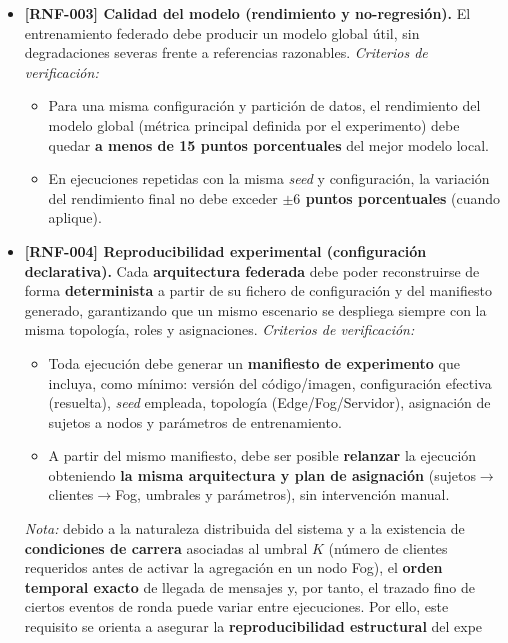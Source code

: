 \documentclass{report}
\begin{document}
\begin{itemize}
  \item \textbf{[RNF-003] Calidad del modelo (rendimiento y no-regresión).}  
  El entrenamiento federado debe producir un modelo global útil, sin degradaciones severas frente a referencias razonables.
  \textit{Criterios de verificación:}
  \begin{itemize}
    \item Para una misma configuración y partición de datos, el rendimiento del modelo global (métrica principal definida por el experimento) debe quedar \textbf{a menos de 15 puntos porcentuales} del mejor modelo local.
    \item En ejecuciones repetidas con la misma \textit{seed} y configuración, la variación del rendimiento final no debe exceder \textbf{$\pm 6$ puntos porcentuales} (cuando aplique).
  \end{itemize}

\item \textbf{[RNF-004] Reproducibilidad experimental (configuración declarativa).}  
Cada \textbf{arquitectura federada} debe poder reconstruirse de forma \textbf{determinista} a partir de su fichero de configuración y del manifiesto generado, garantizando que un mismo escenario se despliega siempre con la misma topología, roles y asignaciones.
\textit{Criterios de verificación:}
\begin{itemize}
  \item Toda ejecución debe generar un \textbf{manifiesto de experimento} que incluya, como mínimo: versión del código/imagen, configuración efectiva (resuelta), \textit{seed} empleada, topología (Edge/Fog/Servidor), asignación de sujetos a nodos y parámetros de entrenamiento.
  \item A partir del mismo manifiesto, debe ser posible \textbf{relanzar} la ejecución obteniendo \textbf{la misma arquitectura y plan de asignación} (sujetos$\rightarrow$clientes$\rightarrow$Fog, umbrales y parámetros), sin intervención manual.
\end{itemize}

\textit{Nota:} debido a la naturaleza distribuida del sistema y a la existencia de \textbf{condiciones de carrera} asociadas al umbral $K$ (número de clientes requeridos antes de activar la agregación en un nodo Fog), el \textbf{orden temporal exacto} de llegada de mensajes y, por tanto, el trazado fino de ciertos eventos de ronda puede variar entre ejecuciones. Por ello, este requisito se orienta a asegurar la \textbf{reproducibilidad estructural} del expe


\end{itemize}
\end{document}
